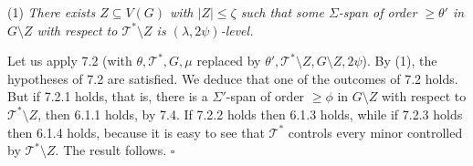\hspace*{12pt}(1) \textit{There exists $Z \subseteq V(G)$ with $|Z| \le \zeta$ such that some $\Sigma$-span of order $\ge \theta'$ in $G \setminus Z$ with respect to $\mathcal{T}^* \setminus Z$ is $(\lambda, 2\psi)$-level.}

Let us apply 7.2 (with $\theta, \mathcal{T}^*, G, \mu$ replaced by $\theta', \mathcal{T}^* \setminus Z, G \setminus Z, 2\psi$). By (1), the hypotheses of 7.2 are satisfied. We deduce that one of the outcomes of 7.2 holds. But if 7.2.1 holds, that is, there is a $\Sigma'$-span of order $\ge \phi$ in $G \setminus Z$ with respect to $\mathcal{T}^* \setminus Z$, then 6.1.1 holds, by 7.4. If 7.2.2 holds then 6.1.3 holds, while if 7.2.3 holds then 6.1.4 holds, because it is easy to see that $\mathcal{T}^*$ controls every minor controlled by $\mathcal{T}^* \setminus Z$. The result follows. $\square$
